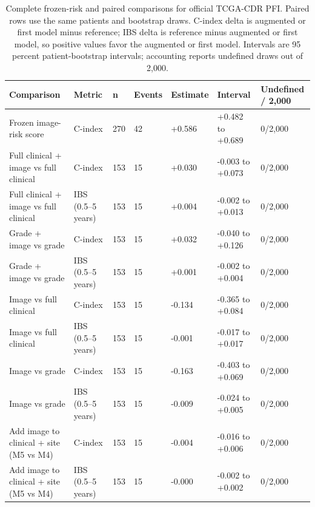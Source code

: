 \begin{table}[H]
\centering
\scriptsize
\caption{Complete frozen-risk and paired comparisons for official TCGA-CDR PFI. Paired rows use the same patients and bootstrap draws. C-index delta is augmented or first model minus reference; IBS delta is reference minus augmented or first model, so positive values favor the augmented or first model. Intervals are 95 percent patient-bootstrap intervals; accounting reports undefined draws out of 2,000.}
\label{tab:supp-outcome-official-pfi}
\begin{tabular}{@{}p{}p{}p{}p{}p{}p{}p{}@{}}
\toprule
Comparison & Metric & n & Events & Estimate & Interval & Undefined / 2,000 \\
\midrule
Frozen image-risk score & C-index & 270 & 42 & +0.586 & +0.482 to +0.689 & 0/2,000 \\
Full clinical + image vs full clinical & C-index & 153 & 15 & +0.030 & -0.003 to +0.073 & 0/2,000 \\
Full clinical + image vs full clinical & IBS (0.5--5 years) & 153 & 15 & +0.004 & -0.002 to +0.013 & 0/2,000 \\
Grade + image vs grade & C-index & 153 & 15 & +0.032 & -0.040 to +0.126 & 0/2,000 \\
Grade + image vs grade & IBS (0.5--5 years) & 153 & 15 & +0.001 & -0.002 to +0.004 & 0/2,000 \\
Image vs full clinical & C-index & 153 & 15 & -0.134 & -0.365 to +0.084 & 0/2,000 \\
Image vs full clinical & IBS (0.5--5 years) & 153 & 15 & -0.001 & -0.017 to +0.017 & 0/2,000 \\
Image vs grade & C-index & 153 & 15 & -0.163 & -0.403 to +0.069 & 0/2,000 \\
Image vs grade & IBS (0.5--5 years) & 153 & 15 & -0.009 & -0.024 to +0.005 & 0/2,000 \\
Add image to clinical + site (M5 vs M4) & C-index & 153 & 15 & -0.004 & -0.016 to +0.006 & 0/2,000 \\
Add image to clinical + site (M5 vs M4) & IBS (0.5--5 years) & 153 & 15 & -0.000 & -0.002 to +0.002 & 0/2,000 \\
\bottomrule
\end{tabular}
\end{table}
